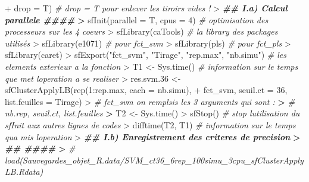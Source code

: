\documentclass[
  11pt,
  french,
  a4paper,
  extrafontsizes,onecolumn,openright
  ]{memoir}
\newenvironment{Shaded}{\begin{snugshade}}{\end{snugshade}}
\newcommand{\AttributeTok}[1]{\textcolor[rgb]{0.77,0.63,0.00}{#1}}
\newcommand{\CommentTok}[1]{\textcolor[rgb]{0.56,0.35,0.01}{\textit{#1}}}
\newcommand{\DecValTok}[1]{\textcolor[rgb]{0.00,0.00,0.81}{#1}}
\newcommand{\DocumentationTok}[1]{\textcolor[rgb]{0.56,0.35,0.01}{\textbf{\textit{#1}}}}
\newcommand{\ErrorTok}[1]{\textcolor[rgb]{0.64,0.00,0.00}{\textbf{#1}}}
\newcommand{\FloatTok}[1]{\textcolor[rgb]{0.00,0.00,0.81}{#1}}
\newcommand{\FunctionTok}[1]{\textcolor[rgb]{0.00,0.00,0.00}{#1}}
\newcommand{\NormalTok}[1]{#1}
\newcommand{\OtherTok}[1]{\textcolor[rgb]{0.56,0.35,0.01}{#1}}
\newcommand{\SpecialCharTok}[1]{\textcolor[rgb]{0.00,0.00,0.00}{#1}}
\newcommand{\StringTok}[1]{\textcolor[rgb]{0.31,0.60,0.02}{#1}}
\begin{document}
\begin{Shaded}
\begin{Highlighting}[]
\SpecialCharTok{+}     \AttributeTok{drop =}\NormalTok{ T)  }\CommentTok{\# drop = T pour enlever les tiroirs vides !}
\SpecialCharTok{\textgreater{}} \DocumentationTok{\#\# I.a) Calcul parallele \#\#\#\#}
\ErrorTok{\textgreater{}} \FunctionTok{sfInit}\NormalTok{(}\AttributeTok{parallel =}\NormalTok{ T, }\AttributeTok{cpus =} \DecValTok{4}\NormalTok{)  }\CommentTok{\# optimisation des processeurs sur les 4 coeurs}
\SpecialCharTok{\textgreater{}} \FunctionTok{sfLibrary}\NormalTok{(caTools)  }\CommentTok{\# la library des packages utilisés}
\SpecialCharTok{\textgreater{}} \FunctionTok{sfLibrary}\NormalTok{(e1071)  }\CommentTok{\# pour fct\_svm}
\SpecialCharTok{\textgreater{}} \FunctionTok{sfLibrary}\NormalTok{(pls)  }\CommentTok{\# pour fct\_pls}
\SpecialCharTok{\textgreater{}} \FunctionTok{sfLibrary}\NormalTok{(caret)}
\SpecialCharTok{\textgreater{}} \FunctionTok{sfExport}\NormalTok{(}\StringTok{"fct\_svm"}\NormalTok{, }\StringTok{"Tirage"}\NormalTok{, }\StringTok{"rep.max"}\NormalTok{, }\StringTok{"nb.simu"}\NormalTok{)  }\CommentTok{\# les elements exterieur a la fonction }
\SpecialCharTok{\textgreater{}}\NormalTok{ T1 }\OtherTok{\textless{}{-}} \FunctionTok{Sys.time}\NormalTok{()  }\CommentTok{\# information sur le temps que met l\textquotesingle{}operation a se realiser}
\SpecialCharTok{\textgreater{}}\NormalTok{ res.svm}\FloatTok{.36} \OtherTok{\textless{}{-}} \FunctionTok{sfClusterApplyLB}\NormalTok{(}\FunctionTok{rep}\NormalTok{(}\DecValTok{1}\SpecialCharTok{:}\NormalTok{rep.max, }\AttributeTok{each =}\NormalTok{ nb.simu), }
\SpecialCharTok{+}\NormalTok{     fct\_svm, }\AttributeTok{seuil.ct =} \DecValTok{36}\NormalTok{, }\AttributeTok{list.feuilles =}\NormalTok{ Tirage)}
\SpecialCharTok{\textgreater{}} \CommentTok{\# fct\_svm on remplsis les 3 arguments qui sont :}
\ErrorTok{\textgreater{}} \CommentTok{\# nb.rep, seuil.ct, list.feuilles}
\ErrorTok{\textgreater{}}\NormalTok{ T2 }\OtherTok{\textless{}{-}} \FunctionTok{Sys.time}\NormalTok{()}
\SpecialCharTok{\textgreater{}} \FunctionTok{sfStop}\NormalTok{()  }\CommentTok{\# stop l\textquotesingle{}utilisation du sfInit aux autres lignes de codes}
\SpecialCharTok{\textgreater{}} \FunctionTok{difftime}\NormalTok{(T2, T1)  }\CommentTok{\# information sur le temps qu\textquotesingle{}a mis l\textquotesingle{}operation }
\SpecialCharTok{\textgreater{}} \DocumentationTok{\#\# I.b) Enregistrement des criteres de precision}
\ErrorTok{\textgreater{}} \DocumentationTok{\#\# \#\#\#\#}
\ErrorTok{\textgreater{}} \CommentTok{\# load(\textquotesingle{}Sauvegardes\_objet\_R.data/SVM\_ct36\_6rep\_100simu\_3cpu\_sfClusterApplyLB.Rdata\textquotesingle{})}

\end{Highlighting}
\end{Shaded}
\end{document}
